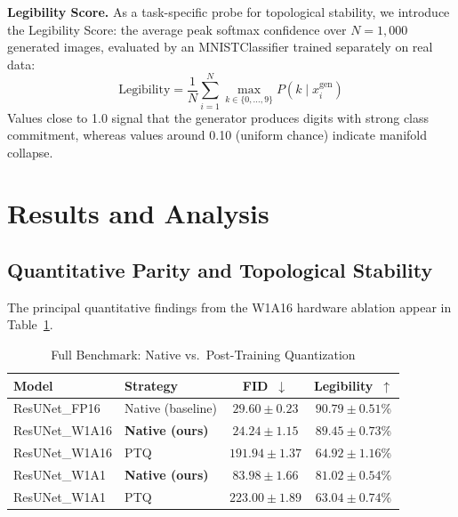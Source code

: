 \documentclass[conference]{IEEEtran}
\begin{document}
\textbf{Legibility Score.} As a task-specific probe for topological stability, we
introduce the Legibility Score: the average peak softmax confidence over $N=1{,}000$
generated images, evaluated by an MNISTClassifier trained separately on real data:
\begin{equation}
  \text{Legibility} = \frac{1}{N}\sum_{i=1}^{N}
  \max_{k\in\{0,\ldots,9\}} P\!\left(k \mid x_i^{\text{gen}}\right)
  \label{eq:legibility}
\end{equation}
Values close to 1.0 signal that the generator produces digits with strong class
commitment, whereas values around 0.10 (uniform chance) indicate manifold collapse.

\section{Results and Analysis}

\subsection{Quantitative Parity and Topological Stability}

The principal quantitative findings from the W1A16 hardware ablation appear in
Table~\ref{tab:main}.

\begin{table}[h]
\centering
\caption{Full Benchmark: Native vs.\ Post-Training Quantization}
\label{tab:main}
\begin{tabular}{@{}llcc@{}}
\toprule
\textbf{Model} & \textbf{Strategy} & \textbf{FID~$\downarrow$} &
\textbf{Legibility~$\uparrow$} \\
\midrule
ResUNet\_FP16  & Native (baseline) & $29.60 \pm 0.23$  & $90.79 \pm 0.51$\% \\
ResUNet\_W1A16 & \textbf{Native (ours)} & $\mathbf{24.24 \pm 1.15}$  & $\mathbf{89.45 \pm 0.73}$\% \\
ResUNet\_W1A16 & PTQ               & $191.94 \pm 1.37$ & $64.92 \pm 1.16$\% \\
\midrule
ResUNet\_W1A1  & \textbf{Native (ours)} & $\mathbf{83.98 \pm 1.66}$  & $\mathbf{81.02 \pm 0.54}$\% \\
ResUNet\_W1A1  & PTQ               & $223.00 \pm 1.89$ & $63.04 \pm 0.74$\% \\
\bottomrule
\end{tabular}
\end{table}
\end{document}
